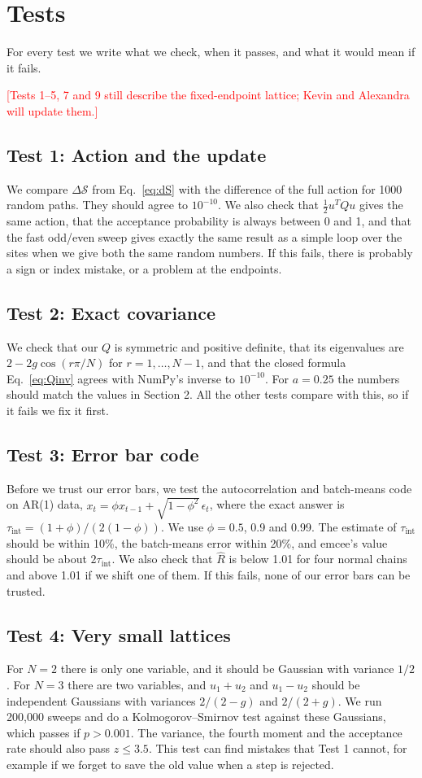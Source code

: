 \documentclass[11pt]{article}
\newcommand{\fillin}[1]{\textcolor{red}{[#1]}}
\begin{document}
\section{Tests}
For every test we write what we check, when it passes, and what it would mean if it fails.

\fillin{Tests 1--5, 7 and 9 still describe the fixed-endpoint lattice; Kevin and Alexandra will update them.}

\subsection*{Test 1: Action and the update}
We compare $\Delta\mathcal S$ from Eq.~\eqref{eq:dS} with the difference of the full action for 1000 random paths. They should agree to $10^{-10}$. We also check that $\frac12 u^T Q u$ gives the same action, that the acceptance probability is always between 0 and 1, and that the fast odd/even sweep gives exactly the same result as a simple loop over the sites when we give both the same random numbers. If this fails, there is probably a sign or index mistake, or a problem at the endpoints.

\subsection*{Test 2: Exact covariance}
We check that our $Q$ is symmetric and positive definite, that its eigenvalues are $2 - 2g\cos(r\pi/N)$ for $r = 1, \dots, N-1$, and that the closed formula Eq.~\eqref{eq:Qinv} agrees with NumPy's inverse to $10^{-10}$. For $a = 0.25$ the numbers should match the values in Section 2. All the other tests compare with this, so if it fails we fix it first.

\subsection*{Test 3: Error bar code}
Before we trust our error bars, we test the autocorrelation and batch-means code on AR(1) data, $x_t = \phi x_{t-1} + \sqrt{1-\phi^2}\,\epsilon_t$, where the exact answer is $\tau_{\text{int}} = (1+\phi)/(2(1-\phi))$. We use $\phi = 0.5$, 0.9 and 0.99. The estimate of $\tau_{\text{int}}$ should be within 10\%, the batch-means error within 20\%, and emcee's value should be about $2\tau_{\text{int}}$. We also check that $\hat R$ is below 1.01 for four normal chains and above 1.01 if we shift one of them. If this fails, none of our error bars can be trusted.

\subsection*{Test 4: Very small lattices}
For $N = 2$ there is only one variable, and it should be Gaussian with variance $1/2$. For $N = 3$ there are two variables, and $u_1+u_2$ and $u_1-u_2$ should be independent Gaussians with variances $2/(2-g)$ and $2/(2+g)$. We run 200,000 sweeps and do a Kolmogorov--Smirnov test against these Gaussians, which passes if $p > 0.001$. The variance, the fourth moment and the acceptance rate should also pass $z \le 3.5$. This test can find mistakes that Test 1 cannot, for example if we forget to save the old value when a step is rejected.
\end{document}

